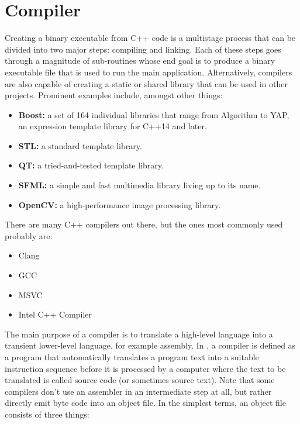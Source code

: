 \section{Compiler}

Creating a binary executable from C++ code is a multistage process that can be
divided into two major steps: compiling and linking. Each of these steps goes
through a magnitude of sub-routines whose end goal is to produce a binary executable
file that is used to run the main application. Alternatively, compilers are also
capable of creating a static or shared library that can be used in other projects.
Prominent examples include, amongst other things:

\begin{itemize}
    \item \textbf{Boost:} a set of 164 individual libraries that range from Algorithm
    to YAP, an expression template library for C++14 and later.
    \item \textbf{STL:} a standard template library.
    \item \textbf{QT:} a tried-and-tested template library.
    \item \textbf{SFML:} a simple and fast multimedia library living up to its name.
    \item \textbf{OpenCV:} a high-performance image processing library.
\end{itemize}

There are many C++ compilers out there, but the ones most commonly used probably are:

\begin{itemize}
    \item Clang
    \item GCC
    \item MSVC
    \item Intel C++ Compiler
\end{itemize}

The main purpose of a compiler is to translate a high-level language into a transient
lower-level language, for example assembly. In \autocite{wirth1996}, a compiler is
defined as a program that automatically translates a program text into a suitable
instruction sequence before it is processed by a computer where the text to be
translated is called source code (or sometimes source text). Note that some compilers
don't use an assembler in an intermediate step at all, but rather directly emit
byte code into an object file. In the simplest terms, an object file consists of
three things:

